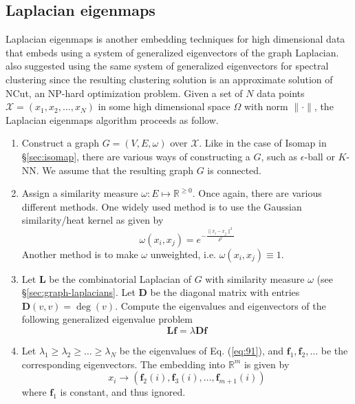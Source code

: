 \subsection{Laplacian eigenmaps}
\label{sec:laplacian-eigenmaps}
Laplacian eigenmaps \citep{belkin03:_laplac} is another embedding
techniques for high dimensional data that embeds using a system of
generalized eigenvectors of the graph Laplacian. \citet{shi97:_normal}
also suggested using the same system of generalized eigenvectors for
spectral clustering since the resulting clustering solution is an
approximate solution of NCut, an NP-hard optimization problem. Given a
set of $N$ data points $\mathcal{X} = (x_1, x_2, \dots, x_N)$ in some
high dimensional space $\Omega$ with norm $\| \cdot \|$, the Laplacian
eigenmaps algorithm proceeds as follow.
\begin{enumerate}
\item Construct a graph $G = (V,E,\omega)$ over $\mathcal{X}$. Like in
  the case of Isomap in \S \ref{sec:isomap}, there are various ways of
  constructing a $G$, such as $\epsilon$-ball or $K$-NN. We assume
  that the resulting graph $G$ is connected. 
\item Assign a similarity measure $\omega \colon E \mapsto
  \mathbb{R}^{\geq 0}$. Once again, there are various different
  methods. One widely used method is to use the Gaussian
  similarity/heat kernel as given by
  \begin{equation}
    \label{eq:88}
    \omega(x_i,x_j) = e^{-\frac{\|x_i - x_j\|^2}{\delta^2}}
  \end{equation}
  Another method is to make $\omega$ unweighted, i.e. $\omega(x_i,x_j)
  \equiv 1$.
\item Let $\mathbf{L}$ be the combinatorial Laplacian of $G$ with
  similarity measure $\omega$ (see \S \ref{sec:graph-laplacians}. Let
  $\mathbf{D}$ be the diagonal matrix with entries $\mathbf{D}(v,v) =
  \deg(v)$. Compute the eigenvalues and eigenvectors of the following
  generalized eigenvalue problem
  \begin{equation}
    \label{eq:91}
    \mathbf{Lf} = \lambda \mathbf{Df}
  \end{equation}
\item Let $\lambda_1 \geq \lambda_2 \geq \dots \geq \lambda_N$ be the
  eigenvalues of Eq. (\ref{eq:91}), and $\mathbf{f}_1, \mathbf{f}_2,
  \dots$ be the corresponding eigenvectors. The embedding into
  $\mathbb{R}^{m}$ is given by
  \begin{equation}
    \label{eq:92}
    x_i \rightarrow (\mathbf{f}_2(i), \mathbf{f}_3(i), \dots,
    \mathbf{f}_{m+1}(i))
  \end{equation}
  where $\mathbf{f}_1$ is constant, and thus ignored.  
\end{enumerate}
